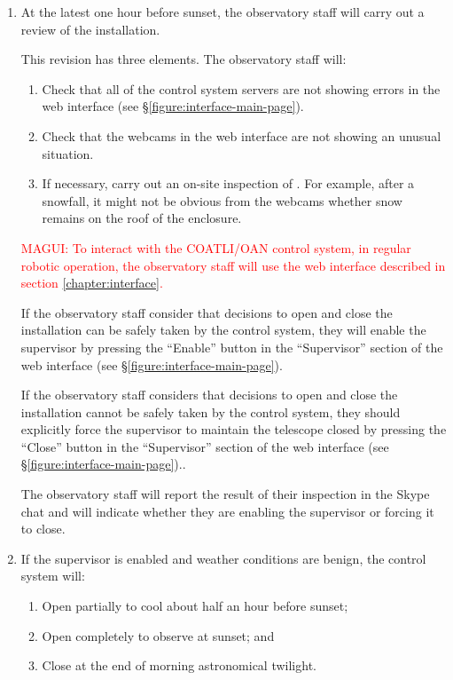\begin{enumerate}

\item At the latest one hour before sunset, the observatory staff will carry out a review of the {\projectname} installation. 

This revision has three elements. The observatory staff will:

\begin{enumerate}
\item
Check that all of the control system servers are not showing errors in the web interface (see \S\ref{figure:interface-main-page}). 
\item
Check that the webcams in the web interface are not showing an unusual situation.
\item
If necessary, carry out an on-site inspection of {\projectname}. For example, after a snowfall, it might not be obvious from the webcams whether snow remains on the roof of the enclosure.
\end{enumerate}

\textcolor{red}{MAGUI: To interact with the COATLI/OAN control system, in regular robotic operation, the observatory staff will use the web interface described in section \ref{chapter:interface}.}

If the observatory staff consider that decisions to open and close the installation can be safely taken by the control system, they will enable the supervisor by pressing the “Enable” button in the “Supervisor” section of the web interface (see \S\ref{figure:interface-main-page}).

If the observatory staff considers that decisions to open and close the installation cannot be safely taken by the control system, they should explicitly force the supervisor to maintain the telescope closed by pressing the “Close” button in the “Supervisor” section of the web interface (see \S\ref{figure:interface-main-page}).. 

The observatory staff will report the result of their inspection in the Skype chat and will indicate whether they are enabling the supervisor or forcing it to close.

\item
If the supervisor is enabled and weather conditions are benign, the control system will:
\begin{enumerate}
\item
Open partially to cool about half an hour before sunset;
\item
Open completely to observe at sunset; and
\item
Close at the end of morning astronomical twilight.
\end{enumerate}


\end{enumerate}
